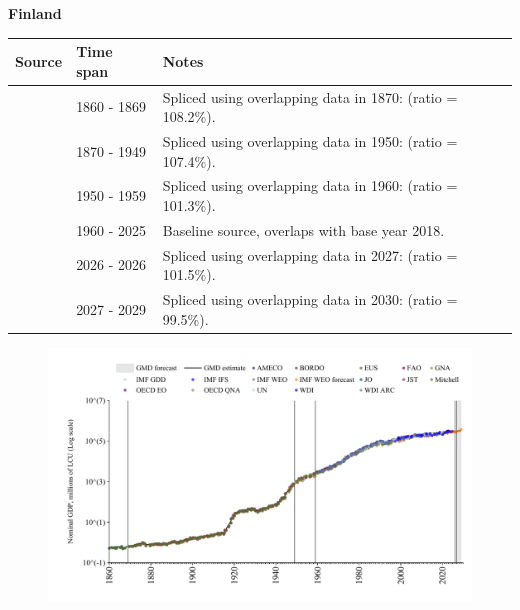 \documentclass[12pt,a4paper,landscape]{article}
\begin{document}
\begin{adjustbox}{max totalsize={\paperwidth}{\paperheight},center}
\begin{minipage}[t][\textheight][t]{\textwidth}
\vspace*{0.5cm}
{}
\begin{center}
{\Large\bfseries Finland}
\end{center}
\vspace{0.5cm}
\begin{table}[H]
\centering
\small
\begin{tabular}{|l|l|l|}
\hline
\textbf{Source} & \textbf{Time span} & \textbf{Notes} \\
\hline
\rowcolor{white}\cite{Mitchell}& 1860 - 1869 &Spliced using overlapping data in 1870: (ratio = 108.2\%).\\
\rowcolor{lightgray}\cite{JST}& 1870 - 1949 &Spliced using overlapping data in 1950: (ratio = 107.4\%).\\
\rowcolor{white}\cite{IMF_GDD}& 1950 - 1959 &Spliced using overlapping data in 1960: (ratio = 101.3\%).\\
\rowcolor{lightgray}\cite{OECD_EO}& 1960 - 2025 &Baseline source, overlaps with base year 2018.\\
\rowcolor{white}\cite{AMECO}& 2026 - 2026 &Spliced using overlapping data in 2027: (ratio = 101.5\%).\\
\rowcolor{lightgray}\cite{IMF_WEO_forecast}& 2027 - 2029 &Spliced using overlapping data in 2030: (ratio = 99.5\%).\\
\hline
\end{tabular}
\end{table}
\begin{figure}[H]
\centering
\includegraphics[width=\textwidth,height=0.6\textheight,keepaspectratio]{graphs/FIN_nGDP.pdf}
\end{figure}
\end{minipage}
\end{adjustbox}
\end{document}
